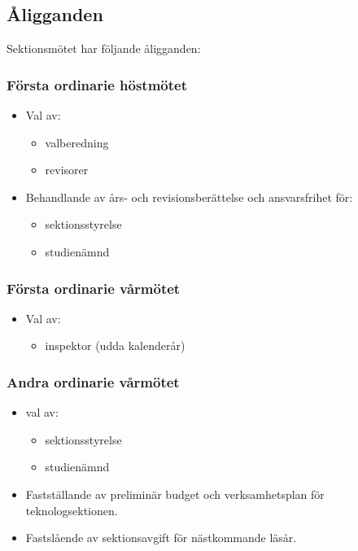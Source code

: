 \subsection{Åligganden}
Sektionsmötet har följande åligganden:
\subsubsection{Första ordinarie höstmötet}
\begin{itemize}
	\item Val av: 
	\begin{itemize}
		\item valberedning
		\item revisorer
	\end{itemize}
	\item Behandlande av års- och revisionsberättelse och ansvarsfrihet för:
	\begin{itemize}
		\item sektionsstyrelse
		\item studienämnd
	\end{itemize}
\end{itemize}
	
\subsubsection{Första ordinarie vårmötet}
\begin{itemize}
	\item Val av: 
	\begin{itemize}
		\item inspektor (udda kalenderår)
	\end{itemize}
\end{itemize}


\subsubsection{Andra ordinarie vårmötet}
\begin{itemize}
	\item val av: 
	\begin{itemize}
		\item sektionsstyrelse
		\item studienämnd
	\end{itemize}
	\item Fastställande av preliminär budget och verksamhetsplan för teknologsektionen.
	\item Fastslående av sektionsavgift för nästkommande läsår.
\end{itemize}

